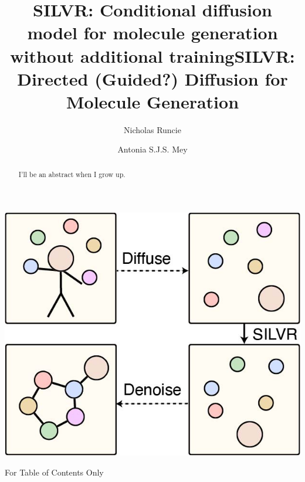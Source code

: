 \documentclass[journal=jacsat,manuscript=article]{achemso}
\author{Nicholas Runcie}
\author{Antonia S.J.S. Mey}
\title[SILVR: Molecular Generation for binding modes]
  {SILVR: Conditional diffusion model for molecule generation without additional training}
\title[SILVR: Molecular Generation for binding modes]
  {SILVR: Directed (Guided?) Diffusion for Molecule Generation}
\begin{document}
\begin{tocentry}
\centering
    \includegraphics{paper/Figures/TOC/TOC_stickman_to_mol.jpg}
    \caption{For Table of Contents Only}
    \label{fig:toc}
\end{tocentry}

\begin{abstract}
I'll be an abstract when I grow up. 
\end{abstract}

\end{document}
